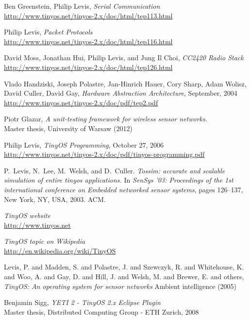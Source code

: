 \begin{thebibliography}{99}
 Ben Greenstein, Philip Levis, \textit{Serial Communication} \\ \url{http://www.tinyos.net/tinyos-2.x/doc/html/tep113.html}

 Philip Levis, \textit{Packet Protocols} \\ \url{http://www.tinyos.net/tinyos-2.x/doc/html/tep116.html}

 David Moss, Jonathan Hui, Philip Levis, and Jung Il Choi, \textit{CC2420 Radio Stack} \\ \url{http://www.tinyos.net/tinyos-2.x/doc/html/tep126.html}

 Vlado Handziski, Joseph Polastre, Jan-Hinrich Hauer, Cory Sharp, Adam Wolisz, David Culler, David Gay, \textit{Hardware Abstraction Architecture}, September,  2004 \\ \url{http://www.tinyos.net/tinyos-2.x/doc/pdf/tep2.pdf}

 Piotr Glazar, \textit{A unit-testing framework for wireless sensor networks.} \\ Master thesis, University of Warsaw (2012)

 Philip Levis, \textit{TinyOS Programming}, October 27, 2006 \\ \url{http://www.tinyos.net/tinyos-2.x/doc/pdf/tinyos-programming.pdf}

 P.~Levis, N.~Lee, M.~Welsh, and D.~Culler.  \textit{Tossim: accurate and scalable simulation of entire tinyos applications.} \newblock In {\em SenSys '03: Proceedings of the 1st international conference on Embedded networked sensor systems}, pages 126--137, New York, NY, USA, 2003. ACM.

 \textit{TinyOS website} \\ \url{http://www.tinyos.net}

 \textit{TinyOS topic on Wikipedia} \\ \url{http://en.wikipedia.org/wiki/TinyOS}

 Levis, P. and Madden, S. and Polastre, J. and Szewczyk, R. and Whitehouse, K. and Woo, A. and Gay, D. and Hill, J. and Welsh, M. and Brewer, E. and others, \textit{TinyOS: An operating system for sensor networks} Ambient intelligence (2005)

 Benjamin Sigg, \textit{YETI 2 - TinyOS 2.x Eclipse Plugin} \\ Master thesis, Distributed Computing Group - ETH Zurich, 2008


\end{thebibliography}
